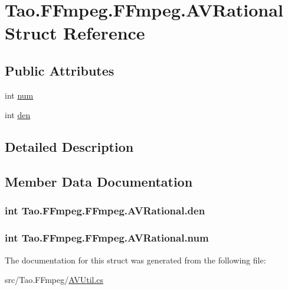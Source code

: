 \hypertarget{struct_tao_1_1_f_fmpeg_1_1_f_fmpeg_1_1_a_v_rational}{
\section{Tao.FFmpeg.FFmpeg.AVRational Struct Reference}
\label{struct_tao_1_1_f_fmpeg_1_1_f_fmpeg_1_1_a_v_rational}
}
\subsection*{Public Attributes}
\begin{DoxyCompactItemize}
\item 
int \hyperlink{struct_tao_1_1_f_fmpeg_1_1_f_fmpeg_1_1_a_v_rational_a179120b629e1b18a0529ea91c7f2d6f8}{num}
\item 
int \hyperlink{struct_tao_1_1_f_fmpeg_1_1_f_fmpeg_1_1_a_v_rational_af8c1f9f8c3c17d670e85f3de14fbad71}{den}
\end{DoxyCompactItemize}


\subsection{Detailed Description}


\subsection{Member Data Documentation}
\hypertarget{struct_tao_1_1_f_fmpeg_1_1_f_fmpeg_1_1_a_v_rational_af8c1f9f8c3c17d670e85f3de14fbad71}{
\subsubsection[{den}]{\setlength{\rightskip}{0pt plus 5cm}int {\bf Tao.FFmpeg.FFmpeg.AVRational.den}}}
\label{struct_tao_1_1_f_fmpeg_1_1_f_fmpeg_1_1_a_v_rational_af8c1f9f8c3c17d670e85f3de14fbad71}
\hypertarget{struct_tao_1_1_f_fmpeg_1_1_f_fmpeg_1_1_a_v_rational_a179120b629e1b18a0529ea91c7f2d6f8}{
\subsubsection[{num}]{\setlength{\rightskip}{0pt plus 5cm}int {\bf Tao.FFmpeg.FFmpeg.AVRational.num}}}
\label{struct_tao_1_1_f_fmpeg_1_1_f_fmpeg_1_1_a_v_rational_a179120b629e1b18a0529ea91c7f2d6f8}


The documentation for this struct was generated from the following file:\begin{DoxyCompactItemize}
\item 
src/Tao.FFmpeg/\hyperlink{_a_v_util_8cs}{AVUtil.cs}\end{DoxyCompactItemize}
